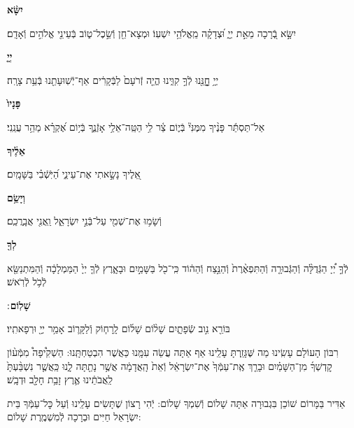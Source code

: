 \documentclass[twoside, openany, parskip=half, 11pt]{book}
\begin{document}
\textbf{יִשָּׂ֨א}
\hfill \begin{footnotesize}
יִשָּׂ֣א בְֿ֭רָכָה מֵאֵ֣ת יְיָ֑ וּ֝צְדָקָ֗ה מֵֽאֱלֹהֵ֥י יִשְׁעֽוֹ׃ וּמְצָא־חֵ֖ן וְֿשֵׂ֣כֶל־ט֑וֹב בְּֿעֵינֵ֖י אֱלֹהִ֣ים וְֿאָדָֽם׃\\
\end{footnotesize}
\textbf{יְיָ֤}
\hfill \begin{footnotesize}
יְיָ֥ חׇׇׇׇָנֵּ֖נוּ לְֿךָ֣ קִוִּ֑ינוּ הֱיֵ֤ה זְֿרֹעָם֙ לַבְּֿקָרִ֔ים אַף־יְֿשֽׁוּעָתֵ֖נוּ בְּֿעֵ֥ת צָרָֽה׃\\
\end{footnotesize}
\textbf{פָּנָיו֙}
\hfill \begin{footnotesize}
אַל־תַּסְתֵּ֬ר פָּנֶ֨יךָ מִמֶּנִּי֘ בְּֿי֢וֹם צַ֫ר לִ֥י הַטֵּֽה־אֵלַ֥י אָזְֿנֶ֑ךָ
בְּֿי֥וֹם אֶ֝קְרָ֗א מַהֵ֥ר עֲנֵֽנִי׃\\
\end{footnotesize}
\textbf{אֵלֶ֔יךָ}
\hfill \begin{footnotesize}
אֵ֭לֶיךָ נָשָׂ֣אתִי אֶת־עֵינַ֑י הַ֝יֹּֽשְֿׁבִ֗י בַּשָּׁמָֽיִם׃\\
\end{footnotesize}
\textbf{וְיָשֵׂ֥ם}
\hfill \begin{footnotesize}
וְֿשָׂמ֥וּ אֶת־שְׁמִ֖י עַל־בְּֿנֵ֣י יִשְׂרָאֵ֑ל וַֽאֲנִ֖י אֲבָֽרֲכֵֽם׃\\
\end{footnotesize}
\textbf{לְךָ֖}
\hfill \begin{footnotesize}
לְֿךָ֣ יְ֠יָ הַגְּֿדֻלָּ֨ה וְֿהַגְּֿבוּרָ֤ה וְֿהַתִּפְאֶ֨רֶת֙ וְֿהַנֵּ֣צַח וְֿהַה֔וֹד
כִּֽי־כֹ֖ל בַּשָּׁמַ֣יִם וּבָאָ֑רֶץ לְֿךָ֤ יְיָ֙ הַמַּמְלָכָ֔ה וְֿהַמִּתְנַשֵּׂ֖א
לְֿכֹ֥ל לְֿרֹֽאשׁ׃\\
\end{footnotesize}
\textbf{שָׁלֽוֹם}
׃ \hfill \begin{footnotesize}
בּוֹרֵ֖א נִ֣וב שְֿׂפָתָ֑יִם שָׁל֨וֹם שָׁל֜וֹם לָֽרָח֧וֹק וְֿלַקָּר֛וֹב
אָמַ֥ר יְיָ֖ וּרְפָאתִֽיו׃
\end{footnotesize}

\clearpage

\begin{paracol}{2}
רִבּוֹן הָעוֹלָם עָשִֽׂינוּ מַה שֶּׁגָּזַֽרְתָּ עָלֵֽינוּ אַף אַתָּה עֲשֵׂה עִמָּֽנוּ כַּאֲשֶׁר הִבְטַחְתָּֽנוּ: הַשְׁקִ֩יפָה֩ מִמְּֿע֨וֹן קׇדְשְׁךָ֜ מִן־הַשָּׁמַ֗יִם וּבָרֵ֤ךְ אֶֽת־עַמְּֿךָ֙ אֶת־יִשְׂרָאֵ֔ל וְֿאֵת֙ הָֽאֲדָמָ֔ה אֲשֶׁ֥ר נָתַ֖תָּה לָ֑נוּ כַּֽאֲשֶׁ֤ר נִשְׁבַּ֨עְתָּ֙ לַֽאֲבֹתֵ֔ינוּ אֶ֛רֶץ זָבַ֥ת חָלָ֖ב וּדְבָֽשׁ׃

\switchcolumn

\kahal
אַדִּיר בַּמָּרוֹם שׁוֹכֵן בִּגְבוּרָה אַתָּה שָׁלוֹם וְֿשִׁמְךָ שָׁלוֹם: יְֿהִי רָצוֹן שֶׁתָּשִׂים עָלֵֽינוּ וְֿעַל כׇּל־עַמְּֿךָ בֵּית יִשְׂרָאֵל חַיִּים וּבְרָכָה לְֿמִשְׁמֶֽרֶת שָׁלוֹם:
\end{paracol}
\end{document}
